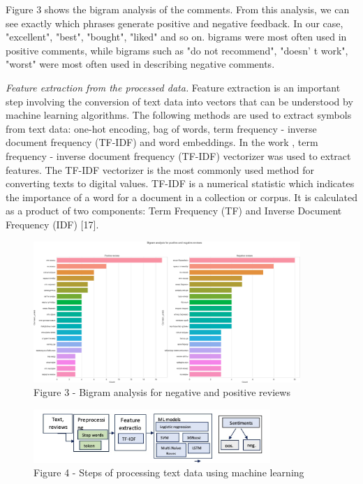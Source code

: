 \begin{multicols}{2}
Figure 3 shows the bigram analysis of the comments. From this analysis,
we can see exactly which phrases generate positive and negative
feedback. In our case, "excellent", "best", "bought", "liked" and so on.
bigrams were most often used in positive comments, while bigrams such as
"do not recommend", "doesn' t work", "worst" were most
often used in describing negative comments.

\emph{Feature extraction from the processed data.} Feature extraction is
an important step involving the conversion of text data into vectors
that can be understood by machine learning algorithms. The following
methods are used to extract symbols from text data: one-hot encoding,
bag of words, term frequency - inverse document frequency (TF-IDF) and
word embeddings. In the work , term frequency - inverse document
frequency (TF-IDF) vectorizer was used to extract features. The TF-IDF
vectorizer is the most commonly used method for converting texts to
digital values. TF-IDF is a numerical statistic which indicates the
importance of a word for a document in a collection or corpus. It is
calculated as a product of two components: Term Frequency (TF) and
Inverse Document Frequency (IDF) {[}17{]}.
\end{multicols}

\begin{figure}[H]
	\centering
	\includegraphics[width=0.9\textwidth]{media/ict/image11}
	\caption*{Figure 3 - Bigram analysis for negative and positive reviews}
\end{figure}

\begin{figure}[H]
	\centering
	\includegraphics[width=0.8\textwidth]{media/ict/image10.2}
	\caption*{Figure 4 - Steps of processing text data using machine learning}
\end{figure}

